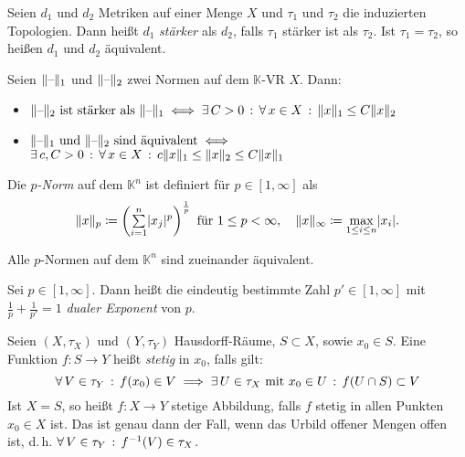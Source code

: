 \documentclass{cheat-sheet}
\newcommand{\K}{\mathbb{K}}
\begin{document}
\begin{definition}
  Seien $d_1$ und $d_2$ Metriken auf einer Menge $X$ und $\tau_1$ und $\tau_2$ die induzierten Topologien. Dann heißt $d_1$ \emph{stärker} als $d_2$, falls $\tau_1$ stärker ist als $\tau_2$. Ist $\tau_1 = \tau_2$, so heißen $d_1$ und $d_2$ äquivalent.
\end{definition}


\begin{satz}
  Seien $\lVert\text{--}\rVert_1$ und $\lVert\text{--}\rVert_2$ zwei Normen auf dem $\K$-VR $X$. Dann:
  \begin{itemize}
    \item $\lVert\text{--}\rVert_2 \text{ ist stärker als } \lVert\text{--}\rVert_1 \iff \exists \, {C > 0} \,:\, \forall \, {x \in X} \,:\, \lVert x\rVert_1 \leq C \lVert x\rVert_2$
    \item $\lVert\text{--}\rVert_1 \text{ und } \lVert\text{--}\rVert_2 \text{ sind äquivalent} \iff $\\
    $\exists \, {c, C > 0} \,:\, \forall \, {x \in X} \,:\, c \lVert x\rVert_1 \leq \lVert x\rVert_2 \leq C \lVert x\rVert_1$
  \end{itemize}
\end{satz}

\begin{definition}
  Die \emph{$p$-Norm} auf dem $\K^n$ ist definiert für $p \in \left[ 1, \infty \right]$ als
  \[
    \norm{x}_p \coloneqq \left( \sum_{i = 1}^n \abs{x_j}^p \right)^{\frac{1}{p}} \text{ für } 1 \leq p < \infty, \quad
    \norm{x}_{\infty} \coloneqq \max_{1 \leq i \leq n} \abs{x_i}.
  \]
\end{definition}

\begin{bem}
  Alle $p$-Normen auf dem $\K^n$ sind zueinander äquivalent.
\end{bem}

\begin{defn}
  Sei $p \in \left[ 1, \infty \right]$. Dann heißt die eindeutig bestimmte Zahl $p' \in \left[ 1, \infty \right]$ mit $\tfrac{1}{p} + \tfrac{1}{p'} = 1$ \emph{dualer Exponent} von $p$.
\end{defn}



\begin{definition}
  Seien $(X, \tau_X)$ und $(Y, \tau_Y)$ Hausdorff-Räume, $S \subset X$, sowie $x_0 \in S$. Eine Funktion $f : S \to Y$ heißt \emph{stetig} in $x_0$, falls gilt:
  \[ \forall \, {V \in \tau_Y} \,:\, f(x_0) \in V \implies \exists \, {U \in \tau_X \text{ mit } x_0 \in U} \,:\, f(U \cap S) \subset V \]
  Ist $X = S$, so heißt $f : X \to Y$ stetige Abbildung, falls $f$ stetig in allen Punkten $x_0 \in X$ ist. Das ist genau dann der Fall, wenn das Urbild offener Mengen offen ist, d.\,h. $\forall \, {V \in \tau_Y} \,:\, f^{-1}(V) \in \tau_X$.
\end{definition}
\end{document}
